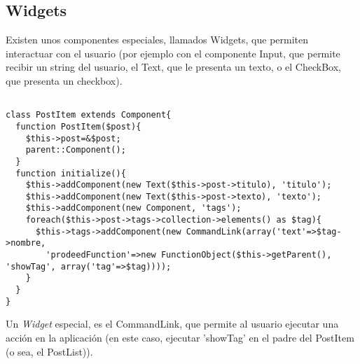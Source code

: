 \subsection{Widgets}
\label{sub-widget}

Existen unos componentes especiales, llamados Widgets, que permiten interactuar con el usuario (por ejemplo con el componente Input, que permite recibir un string del usuario, el Text, que le presenta un texto, o el CheckBox, que presenta un checkbox).

\begin{verbatim}

class PostItem extends Component{
  function PostItem($post){
    $this->post=&$post;
    parent::Component();
  }
  function initialize(){
    $this->addComponent(new Text($this->post->titulo), 'titulo');
    $this->addComponent(new Text($this->post->texto), 'texto');
    $this->addComponent(new Component, 'tags');
    foreach($this->post->tags->collection->elements() as $tag){
      $this->tags->addComponent(new CommandLink(array('text'=>$tag->nombre,
        'prodeedFunction'=>new FunctionObject($this->getParent(), 'showTag', array('tag'=>$tag))));
    }
  }
}

\end{verbatim}

Un \emph{Widget} especial, es el CommandLink, que permite al usuario ejecutar una acción en la aplicación (en este caso, ejecutar 'showTag' en el padre del PostItem (o sea, el PostList)).

